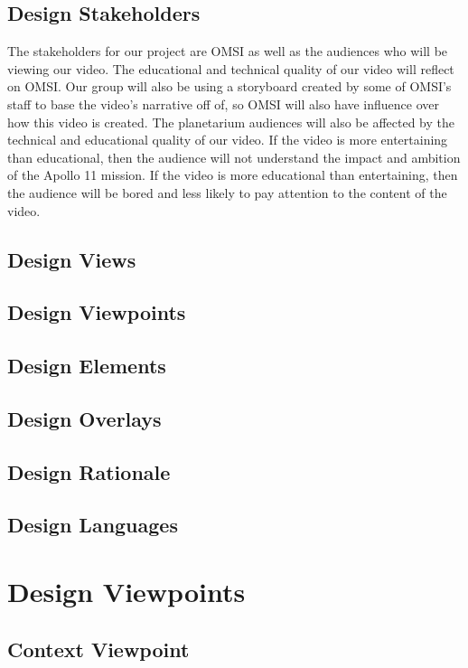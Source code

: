 \documentclass[onecolumn, draftclsnofoot,10pt, compsoc]{IEEEtran}
\begin{document}
    \subsection{Design Stakeholders}
    The stakeholders for our project are OMSI as well as the audiences who will be viewing our video. The educational and technical quality of our video will reflect on OMSI. Our group will also be using a storyboard created by some of OMSI's staff to base the video's narrative off of, so OMSI will also have influence over how this video is created. The planetarium audiences will also be affected by the technical and educational quality of our video. If the video is more entertaining than educational, then the audience will not understand the impact and ambition of the Apollo 11 mission. If the video is more educational than entertaining, then the audience will be bored and less likely to pay attention to the content of the video.
    \subsection{Design Views}
    \subsection{Design Viewpoints}
    \subsection{Design Elements}
    \subsection{Design Overlays}
    \subsection{Design Rationale}
    \subsection{Design Languages}


\section{Design Viewpoints}

    \subsection{Context Viewpoint}
    
\end{document}
